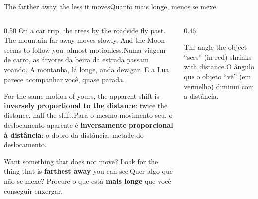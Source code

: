 \documentclass[aspectratio=169,11pt]{beamer}
\newcommand{\tr}[2]{\ifEN#2\else#1\fi}
\newcommand{\bnum}[1]{\textbf{\textcolor{mTeal}{#1}}}
\begin{document}
\begin{frame}{\tr{Quanto mais longe, menos se mexe}{The farther away, the less it moves}}
  \begin{columns}[T]
    \begin{column}{0.50\textwidth}
      \small
      \tr{Numa viagem de carro, as árvores da beira da estrada passam voando. A montanha, lá
      longe, anda devagar. E a Lua parece acompanhar você, quase parada.}{On a car trip, the
      trees by the roadside fly past. The mountain far away moves slowly. And the Moon seems
      to follow you, almost motionless.}
      \medskip

      \tr{Para o mesmo movimento seu, o deslocamento aparente é \bnum{inversamente
      proporcional à distância}: o dobro da distância, metade do deslocamento.}{For the same
      motion of yours, the apparent shift is \bnum{inversely proportional to the distance}:
      twice the distance, half the shift.}
      \medskip

      \begin{ideia}[title={\tr{A ideia}{The idea}}]
        \footnotesize\tr{Quer algo que não se mexe? Procure o que está \bnum{mais longe} que
        você conseguir enxergar.}{Want something that does not move? Look for the thing that is
        \bnum{farthest away} you can see.}
      \end{ideia}
    \end{column}
    \begin{column}{0.46\textwidth}
      \centering
      \par\smallskip
      {\scriptsize\textcolor{mStoneMid}{\tr{O ângulo que o objeto ``vê'' (em vermelho) diminui com a
      distância.}{The angle the object ``sees'' (in red) shrinks with distance.}}}
    \end{column}
  \end{columns}
\end{frame}
\end{document}
